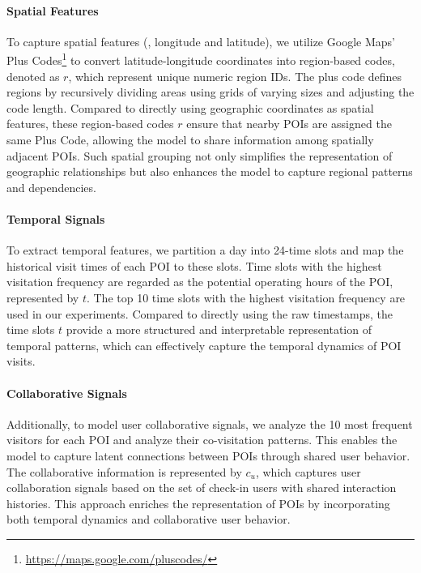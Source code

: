\paragraph{Spatial Features}

To capture spatial features (\eg, longitude and latitude), we utilize Google Maps' Plus Codes\footnote{\url{https://maps.google.com/pluscodes/}} to convert latitude-longitude coordinates into region-based codes, denoted as $r$, which represent unique numeric region IDs. 
The plus code defines regions by recursively dividing areas using grids of varying sizes and adjusting the code length.
Compared to directly using geographic coordinates as spatial features, these region-based codes $r$ ensure that nearby POIs are assigned the same Plus Code, allowing the model to share information among spatially adjacent POIs. 
Such spatial grouping not only simplifies the representation of geographic relationships but also enhances the model to capture regional patterns and dependencies. 

\paragraph{Temporal Signals}

To extract temporal features, we partition a day into 24-time slots and map the historical visit times of each POI to these slots. 
Time slots with the highest visitation frequency are regarded as the potential operating hours of the POI, represented by $t$.
The top 10 time slots with the highest visitation frequency are used in our experiments.
Compared to directly using the raw timestamps, the time slots $t$ provide a more structured and interpretable representation of temporal patterns, which can effectively capture the temporal dynamics of POI visits.

\paragraph{Collaborative Signals}

Additionally, to model user collaborative signals, we analyze the 10 most frequent visitors for each POI and analyze their co-visitation patterns.
This enables the model to capture latent connections between POIs through shared user behavior.
The collaborative information is represented by $c_u$, which captures user collaboration signals based on the set of check-in users with shared interaction histories.
This approach enriches the representation of POIs by incorporating both temporal dynamics and collaborative user behavior.

